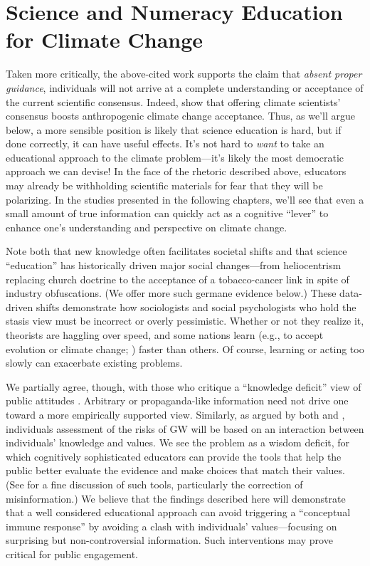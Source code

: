 \section{Science and Numeracy Education for Climate Change}
\label{sec:science-ed}

Taken more critically, the above-cited work supports the claim that \emph{absent
proper guidance}, individuals will not arrive at a complete understanding or
acceptance of the current scientific consensus.  Indeed,
\textcite{lewandowsky_pivotal_2013} show that offering climate scientists'
consensus boosts anthropogenic climate change acceptance.  Thus, as we'll argue
below, a more sensible position is likely that science education is hard, but if
done correctly, it can have useful effects.  It's not hard to \emph{want} to
take an educational approach to the climate problem---it's likely the most
democratic approach we can devise! In the face of the rhetoric described above,
educators may already be withholding scientific materials for fear that they will
be polarizing. In the studies presented in the following chapters, we'll see
that even a small amount of true information can quickly act as a cognitive
``lever'' to enhance one's understanding and perspective on climate change.

Note both that new knowledge often facilitates societal shifts and that science
``education'' has historically driven major social changes—from heliocentrism
replacing church doctrine to the acceptance of a tobacco-cancer link in spite of
industry obfuscations. (We offer more such germane evidence below.) These
data-driven shifts demonstrate how sociologists and social psychologists who
hold the stasis view must be incorrect or overly pessimistic. Whether or not
they realize it, theorists are haggling over speed, and some nations learn
(e.g., to accept evolution or climate change; \cite{ranney_why_2012}) faster than others.
Of course, learning or acting too slowly can exacerbate existing problems.

We partially agree, though, with those who critique a ``knowledge deficit'' view
of public attitudes \parencite[cf.][]{dickson_case_2005}. Arbitrary or
propaganda-like information need not drive one toward a more empirically
supported view. Similarly, as argued by both \textcite{kahan_polarizing_2012}
and \textcite{ranney_why_2012}, individuals assessment of the risks of GW will
be based on an interaction between individuals' knowledge and values. We see the
problem as a wisdom deficit, for which cognitively sophisticated educators can
provide the tools that help the public better evaluate the evidence and make
choices that match their values. (See \cite{lewandowsky_misinformation_2012} for
a fine discussion of such tools, particularly the correction of misinformation.)
We believe that the findings described here will demonstrate that a well
considered educational approach can avoid triggering a “conceptual immune
response” by avoiding a clash with individuals' values---focusing on surprising
but non-controversial information. Such interventions may prove critical for
public engagement.

